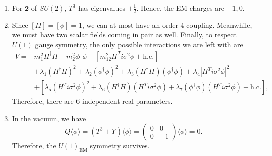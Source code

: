 \begin{solution}
    \begin{enumerate}[label=\roman*)]
        \item For $\mathbf{2}$ of $SU(2)$, $T^3$ has eigenvalues $\pm \frac{1}{2}$. Hence, the EM charges are $-1, 0$.
        \item Since $[H] = [\phi] = 1$, we can at most have an order $4$ coupling. Meanwhile, we must have two scalar fields coming in pair as well. Finally, to respect $U(1)$ gauge symmetry, the only possible interactions we are left with are
        \begin{equation}
\begin{aligned}
V={}&m_1^2H^\dagger H
+m_2^2\phi^\dagger\phi
-\left[m_{12}^2 H^T i\sigma^2\phi+\text{h.c.}\right]\\
&+\lambda_1(H^\dagger H)^2
+\lambda_2(\phi^\dagger\phi)^2
+\lambda_3(H^\dagger H)(\phi^\dagger\phi)
+\lambda_4|H^T i\sigma^2\phi|^2\\
&+\left[
\lambda_5(H^T i\sigma^2\phi)^2
+\lambda_6(H^\dagger H)(H^T i\sigma^2\phi)
+\lambda_7(\phi^\dagger\phi)(H^T i\sigma^2\phi)
+\text{h.c.}
\right],
\end{aligned}
        \end{equation}
        Therefore, there are $6$ independent real parameters.
        \item In the vacuum, we have
        \begin{equation}
            Q\langle \phi\rangle = (T^3 +Y)\langle \phi\rangle =  \begin{pmatrix}
                0 & 0\\
                0 & -1
            \end{pmatrix}\langle \phi\rangle = 0.
        \end{equation}
        Therefore, the $U(1)_\text{EM}$ symmetry survives.


\end{enumerate}
\end{solution}
